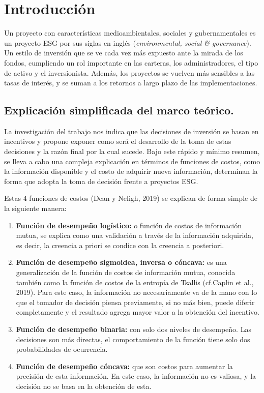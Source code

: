 \documentclass[11pt,letterpaper]{article}
\begin{document}

\tableofcontents
\newpage


\section{Introducci\'on}

Un proyecto con características medioambientales, sociales y gubernamentales es un proyecto ESG por sus siglas en inglés (\textit{environmental, social \& governance}). Un estilo de inversión que se ve cada vez más expuesto ante la mirada de los fondos, cumpliendo un rol importante en las carteras, los administradores, el tipo de activo y el inversionista. Además, los proyectos se vuelven más sensibles a las tasas de interés, y se suman a los retornos a largo plazo de las implementaciones.

\subsection{Explicación simplificada del marco teórico.}

La investigación del trabajo nos indica que las decisiones de inversión se basan en incentivos y propone exponer como será el desarrollo de la toma de estas decisiones y la razón final por la cual sucede. Bajo este rápido y mínimo resumen, se lleva a cabo una compleja explicación en términos de funciones de costos, como la información disponible y el costo de adquirir nueva información, determinan la forma que adopta la toma de decisión frente a proyectos ESG.

Estas 4 funciones de costos (Dean y Neligh, 2019) se explican de forma simple de la siguiente manera:

\begin{enumerate}
    \item \textbf{Función de desempeño logístico:} o función de costos de información mutua, se explica como una validación a través de la información adquirida, es decir, la creencia a priori se condice con la creencia a posteriori. 
    \item \textbf{Función de desempeño sigmoidea, inversa o cóncava:} es una generalización de la función de costos de información mutua, conocida también como la función de costos de la entropía de Tsallis (cf.Caplin et al., 2019). Para este caso, la información no necesariamente va de la mano con lo que el tomador de decisión piensa previamente, si no más bien, puede diferir completamente y el resultado agrega mayor valor a la obtención del incentivo. 
    \item \textbf{Función de desempeño binaria:} con solo dos niveles de desempeño. Las decisiones son más directas, el comportamiento de la función tiene solo dos probabilidades de ocurrencia.
    \item \textbf{Función de desempeño cóncava:} que son costos para aumentar la precisión de esta información. En este caso, la información no es valiosa, y la decisión no se basa en la obtención de esta. 
    
\end{enumerate}
\end{document}
